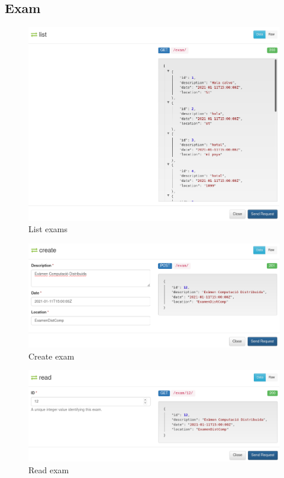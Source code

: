 \documentclass[11pt]{article}
\begin{document}
\subsection{Exam}
\begin{figure}[h!]
\centering
\includegraphics[width=.9\linewidth]{img/list_exams.png}
\caption{List exams}
\end{figure}
\begin{figure}[htbp]
\centering
\includegraphics[width=.9\linewidth]{img/create_exam.png}
\caption{Create exam}
\end{figure}
\begin{figure}[htbp]
\centering
\includegraphics[width=.9\linewidth]{img/read_exam.png}
\caption{Read exam}
\end{figure}
\end{document}
